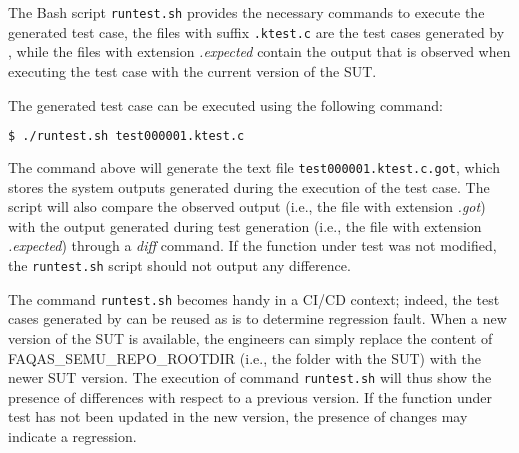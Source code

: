 The Bash script \texttt{runtest.sh} provides the necessary commands to execute the generated test case, the files with suffix \texttt{.ktest.c}  are the test cases generated by \SEMUS, while the files with extension \emph{.expected} contain the output that is observed when executing the test case with the current version of the SUT.

The generated test case can be executed using the following command:

\begin{lstlisting}[language=bash]
 $ ./runtest.sh test000001.ktest.c
\end{lstlisting}

The command above will generate the text file \texttt{test000001.ktest.c.got}, which stores the system outputs generated during the execution of the test case. The script will also compare the observed output (i.e., the file with extension \emph{.got}) with the output generated during test generation (i.e., the file with extension \emph{.expected}) through a \emph{diff} command. If the function under test was not modified, the \texttt{runtest.sh} script should not output any difference. 


The command \texttt{runtest.sh} becomes handy in a CI/CD context; indeed, the test cases generated by \SEMUS can be reused as is to determine regression fault. When a new version of the SUT is available, the engineers can simply replace the content of FAQAS\_SEMU\_REPO\_ROOTDIR (i.e., the folder with the SUT) with the newer SUT version. The execution of command \texttt{runtest.sh} will thus show the presence of differences with respect to a previous version. If the function under test has not been updated in the new version, the presence of changes may indicate a regression.